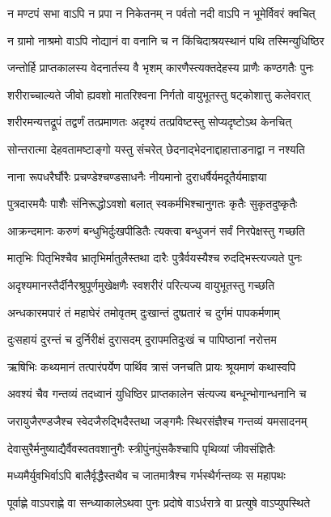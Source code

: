 \twolineshloka
{न मण्टपं सभा वाऽपि न प्रपा न निकेतनम्}
{न पर्वतो नदी वाऽपि न भूमेर्विवरं क्वचित्}


\twolineshloka
{न ग्रामो नाश्रमो वाऽपि नोद्यानं वा वनानि च}
{न किंचिदाश्रयस्थानं पथि तस्मिन्युधिष्ठिर}


\twolineshloka
{जन्तोर्हि प्राप्तकालस्य वेदनार्तस्य वै भृशम्}
{कारणैस्त्यक्तदेहस्य प्राणैः कण्ठगतैः पुनः}


\twolineshloka
{शरीराच्चाल्यते जीवो ह्यवशो मातरिश्वना}
{निर्गतो वायुभूतस्तु षट्कोशात्तु कलेवरात्}


\twolineshloka
{शरीरमन्यत्तद्रूपं तद्वर्णं तत्प्रमाणतः}
{अदृश्यं तत्प्रविष्टस्तु सोप्यदृष्टोऽथ केनचित्}


\threelineshloka
{सोन्तरात्मा देहवतामष्टाङ्गो यस्तु संचरेत्}
{छेदनाद्भेदनाद्दाहात्ताडनाद्वा न नश्यति}
{}


\twolineshloka
{नाना रूपधरैर्घौरैः प्रचण्डेश्चण्डसाधनैः}
{नीयमानो दुराधर्षैर्यमदूतैर्यमाज्ञया}


\twolineshloka
{पुत्रदारमयैः पाशैः संनिरूद्धोऽवशो बलात्}
{स्वकर्मभिश्चानुगतः कृतैः सुकृतदुष्कृतैः}


\twolineshloka
{आक्रन्दमानः करुणं बन्धुभिर्दुःखपीडितैः}
{त्यक्त्वा बन्धुजनं सर्वं निरपेक्षस्तु गच्छति}


\twolineshloka
{मातृभिः पितृभिश्चैव भ्रातृभिर्मातुलैस्तथा}
{दारैः पुत्रैर्वयस्यैश्च रुदद्भिस्त्यज्यते पुनः}


\twolineshloka
{अदृश्यमानस्तैर्दीनैरश्रुपूर्णमुखेक्षणैः}
{स्वशरीरं परित्यज्य वायुभूतस्तु गच्छति}


\twolineshloka
{अन्धकारमपारं तं महाघेरं तमोवृतम्}
{दुःखान्तं दुष्प्रतारं च दुर्गमं पापकर्मणाम्}


\twolineshloka
{दुःसहायं दुरन्तं च दुर्निरीक्षं दुरासदम्}
{दुरापमतिदुःखं च पापिष्ठानां नरोत्तम}


\twolineshloka
{ऋषिभिः कथ्यमानं तत्पारंपर्येण पार्थिव}
{त्रासं जनचति प्रायः श्रूयमाणं कथास्वपि}


\twolineshloka
{अवश्यं चैव गन्तव्यं तदध्वानं युधिष्ठिर}
{प्राप्तकालेन संत्यज्य बन्धून्भोगान्धनानि च}


\twolineshloka
{जरायुजैरण्डजैश्च स्वेदजैरुद्भिदैस्तथा}
{जङ्गमैः स्थिरसंज्ञैश्च गन्तव्यं यमसादनम्}


\twolineshloka
{देवासुरैर्मनुष्याद्यैर्वैवस्वतवशानुगैः}
{स्त्रीपुंनपुंसकैश्चापि पृथिव्यां जीवसंज्ञितैः}


\twolineshloka
{मध्यमैर्युवभिर्वाऽपि बालैर्वृद्धैस्तथैव च}
{जातमात्रैश्च गर्भस्थैर्गन्तव्यः स महापथः}


\twolineshloka
{पूर्वाह्णे वाऽपराह्णे वा सन्ध्याकालेऽथवा पुनः}
{प्रदोषे वाऽर्धरात्रे वा प्रत्युषे वाऽप्युपस्थिते}


